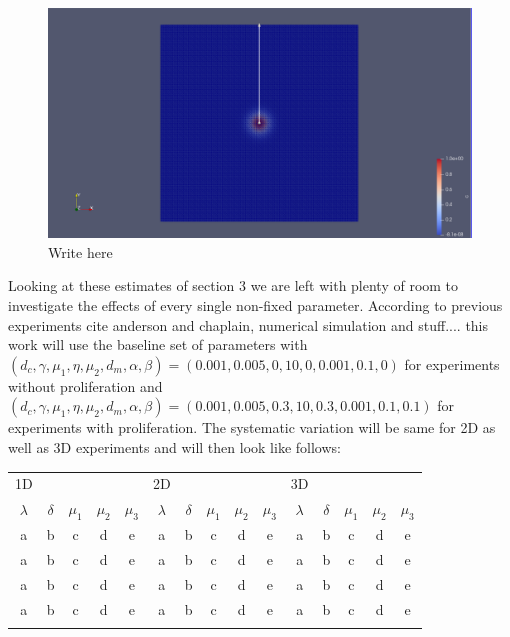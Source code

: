 \begin{figure}
    \centering
    \includegraphics[width=\textwidth]{resources/images/method_photo.png}
    \caption{Write here}
    \label{fig:PlotOverLine}
\end{figure}

Looking at these estimates of section 3 we are left with plenty of room to investigate the effects of every single non-fixed parameter. According to previous experiments cite anderson and chaplain, numerical simulation and stuff.... this work will use the baseline set of parameters with $(d_c, \gamma, \mu_1, \eta, \mu_2, d_m, \alpha, \beta) = (0.001, 0.005, 0, 10, 0, 0.001,0.1, 0)$ for experiments without proliferation and 
$(d_c, \gamma, \mu_1, \eta, \mu_2, d_m, \alpha, \beta) = (0.001, 0.005, 0.3, 10, 0.3, 0.001,0.1, 0.1)$ for experiments with proliferation.
The systematic variation will be same for 2D as well as 3D experiments and will then look like follows: 

\begin{center}
    \begin{tabular}{|| c | c | c | c | c || c | c | c | c | c || c | c | c | c | c ||}
        \hhline{||=|=|=|=|=||=|=|=|=|=||=|=|=|=|=||}
        1D \small & & & & & 2D & & & & & 3D & & & & \\
        \hhline{||=|=|=|=|=||=|=|=|=|=||=|=|=|=|=||}
        $\lambda$ & $\delta$ & $\mu_1$ & $\mu_2$ & $\mu_3$  & $\lambda$ & $\delta$ & $\mu_1$ & $\mu_2$ & $\mu_3$ & $\lambda$ & $\delta$ & $\mu_1$ & $\mu_2$ & $\mu_3$ \\ 
        \hline
        a & b & c & d & e & a & b & c & d & e & a & b & c & d & e \\ \hline 
        a & b & c & d & e & a & b & c & d & e & a & b & c & d & e \\ \hline 
        a & b & c & d & e & a & b & c & d & e & a & b & c & d & e \\ \hline 
        a & b & c & d & e & a & b & c & d & e & a & b & c & d & e \\ \hhline{||=|=|=|=|=||=|=|=|=|=||=|=|=|=|=||} 
    
    \end{tabular}
\end{center}

